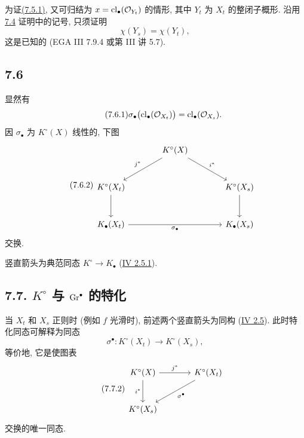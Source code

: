 为证\hyperlink{sga6.e10.eq.7-5-1}{(7.5.1)}, 又可归结为 $x=\operatorname{cl}_\bullet(\mathcal O_{Y_t})$ 的情形, 其中 $Y_t$ 为 $X_t$ 的整闭子概形. 沿用\hyperlink{sga6.e10.sec.7.4}{7.4} 证明中的记号, 只须证明
%
%
%
\[
\chi(Y_s)=\chi(Y_t),
\]
这是已知的 (EGA III 7.9.4 或第 III 讲 5.7).

\subsection*{7.6} 显然有
%
\begin{equation}\tag{7.6.1}
\sigma_\bullet\bigl(\operatorname{cl}_\bullet(\mathcal O_{X_t})\bigr)
=\operatorname{cl}_\bullet(\mathcal O_{X_s}).
\end{equation}
因 $\sigma_\bullet$ 为 $K^\circ(X)$ 线性的, 下图
\begin{equation}\tag{7.6.2}
\begin{tikzcd}[column sep=large,row sep=large]
& K^\circ(X) \arrow[dl,"j^*"'] \arrow[dr,"i^*"] &\\
K^\circ(X_t) \arrow[d] && K^\circ(X_s) \arrow[d]\\
K_\bullet(X_t) \arrow[rr,"\sigma_\bullet"'] && K_\bullet(X_s)
\end{tikzcd}
\end{equation}
交换.

竖直箭头为典范同态 $K^\circ\to K_\bullet$ (\hyperlink{sga6.e04.eq.2-5-1}{IV 2.5.1}).
%

\subsection*{7.7. $K^\circ$ 与 $\operatorname{Gr}^\bullet$ 的特化} 当 $X_t$ 和 $X_s$ 正则时 (例如 $f$ 光滑时), 前述两个竖直箭头为同构 (\hyperlink{sga6.e04.para.2-5}{IV 2.5}). 此时特化同态可解释为同态
%
%
%
\begin{equation}\tag{7.7.1}
\sigma^\bullet:K^\circ(X_t)\longrightarrow K^\circ(X_s),
\end{equation}
等价地, 它是使图表
\begin{equation}\tag{7.7.2}
\begin{tikzcd}[column sep=large,row sep=large]
K^\circ(X) \arrow[r,"j^*"] \arrow[d,"i^*"'] &
K^\circ(X_t) \arrow[dl,"\sigma^\bullet"]\\
K^\circ(X_s) &
\end{tikzcd}
\end{equation}
交换的唯一同态.

